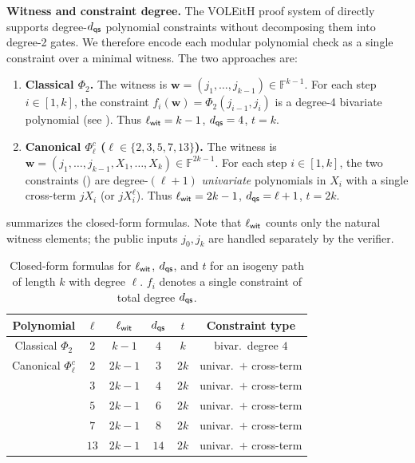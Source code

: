 \documentclass[11pt,a4paper]{article}
\theoremstyle{definition}
\theoremstyle{remark}
\newcommand{\F}{\mathbb{F}}
\newcommand{\polyrel}{\Phi}
\renewcommand{\vec}[1]{\mathbf{#1}}
\begin{document}
\medskip\noindent
\textbf{Witness and constraint degree.}
The VOLEitH proof system of  directly supports degree-$d_{\sf qs}$
polynomial constraints without decomposing them into degree-2 gates.
We therefore encode each modular polynomial check as a single constraint over a
minimal witness. The two approaches are:

\begin{enumerate}[label=(\roman*)]
	\item \textbf{Classical $\polyrel_2$.}
		The witness is $\vec{w} = (j_1, \dots, j_{k-1}) \in \F^{k-1}$.
		For each step $i \in [1, k]$, the constraint
		$f_i(\vec{w}) = \polyrel_2(j_{i-1}, j_i)$ is a degree-4 bivariate
		polynomial (see ).
		Thus $\ell_{\sf wit} = k-1$, $d_{\sf qs} = 4$, $t = k$.

	\item \textbf{Canonical $\polyrel_{\ell}^c$ ($\ell \in \{2,3,5,7,13\}$).}
		The witness is
		$\vec{w} = (j_1, \dots, j_{k-1}, X_1, \dots, X_k) \in \F^{2k-1}$.
		For each step $i \in [1, k]$, the two constraints
		() are degree-$(\ell+1)$ \emph{univariate}
		polynomials in $X_i$ with a single cross-term $j X_i$ (or $j X_i^{\ell}$).
		Thus $\ell_{\sf wit} = 2k-1$, $d_{\sf qs} = \ell+1$, $t = 2k$.
\end{enumerate}

 summarizes the closed-form formulas.
Note that $\ell_{\sf wit}$ counts only the natural witness elements; the public
inputs $j_0, j_k$ are handled separately by the verifier.

\begin{table}[H]
	\centering
	\caption{Closed-form formulas for $\ell_{\sf wit}$, $d_{\sf qs}$, and $t$
		for an isogeny path of length $k$ with degree $\ell$.
		$f_i$ denotes a single constraint of total degree $d_{\sf qs}$.}
	\label{tab:wit-deg-formulas}
	\begin{tabular}{c c c c c c}
		\toprule
		Polynomial & $\ell$ & $\ell_{\sf wit}$ & $d_{\sf qs}$ & $t$ & Constraint type \\
		\midrule
		Classical $\polyrel_2$
			& $2$   & $k-1$   & $4$       & $k$  & bivar.\ degree $4$ \\
		Canonical $\polyrel_{\ell}^c$
			& $2$   & $2k-1$  & $3$       & $2k$ & univar.\ $+$ cross-term \\
			& $3$   & $2k-1$  & $4$       & $2k$ & univar.\ $+$ cross-term \\
			& $5$   & $2k-1$  & $6$       & $2k$ & univar.\ $+$ cross-term \\
			& $7$   & $2k-1$  & $8$       & $2k$ & univar.\ $+$ cross-term \\
			& $13$  & $2k-1$  & $14$      & $2k$ & univar.\ $+$ cross-term \\
		\bottomrule
	\end{tabular}
\end{table}
\end{document}
